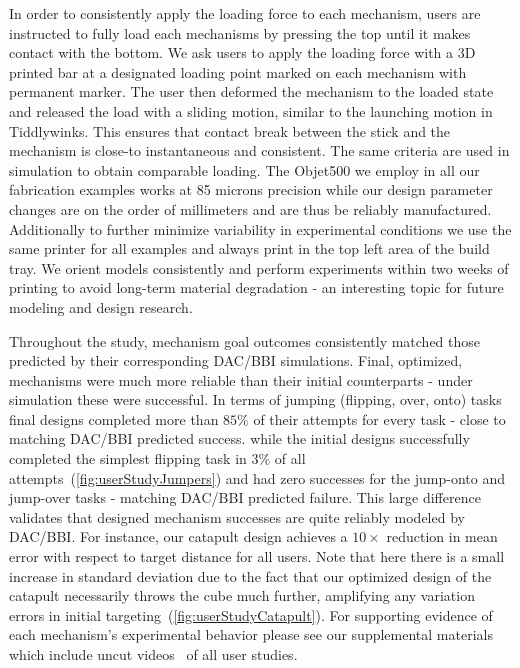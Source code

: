 In order to consistently apply the loading force to each mechanism, users are instructed to fully load each mechanisms by pressing the top until it makes contact with the bottom. We ask users to apply the loading force with a 3D printed bar at a designated loading point marked on each mechanism with permanent marker. The user then deformed the mechanism to the loaded state and released the load with a sliding motion, similar to the launching motion in Tiddlywinks. This ensures that contact break between the stick and the mechanism is close-to instantaneous and consistent.  The same criteria are used in simulation to obtain comparable loading. The Objet500 we employ in all our fabrication examples works at 85 microns precision while our design parameter changes are on the order of millimeters and are thus be reliably manufactured. Additionally to further  minimize variability in experimental conditions we use the same printer for all examples and always print in the top left area of the build tray. We orient models consistently and perform experiments within two weeks of printing to avoid long-term material degradation - an interesting topic for future modeling and design research.

Throughout the study, mechanism goal outcomes consistently matched those predicted by their corresponding DAC/BBI simulations. Final, optimized, mechanisms were much more reliable than their initial counterparts - under simulation these were successful. In terms of jumping (flipping, over, onto) tasks final designs completed more than $85\%$ of their attempts for every task - close to matching DAC/BBI predicted success. while the initial designs successfully completed the simplest flipping task in $3\%$ of all attempts~(\autoref{fig:userStudyJumpers}) and had zero successes for the jump-onto and jump-over tasks - matching DAC/BBI predicted failure. This large difference validates that designed mechanism successes are quite reliably modeled by DAC/BBI.
For instance, our catapult design achieves a $10\times$ reduction in mean error with respect to target distance for all users. Note that here there is a small increase in standard deviation due to the fact that our optimized design of the catapult necessarily throws the cube much further, amplifying any variation errors in initial targeting~(\autoref{fig:userStudyCatapult}).
For supporting evidence of each mechanism's experimental behavior please see our supplemental materials which include uncut videos~\cite{Video} of all user studies.